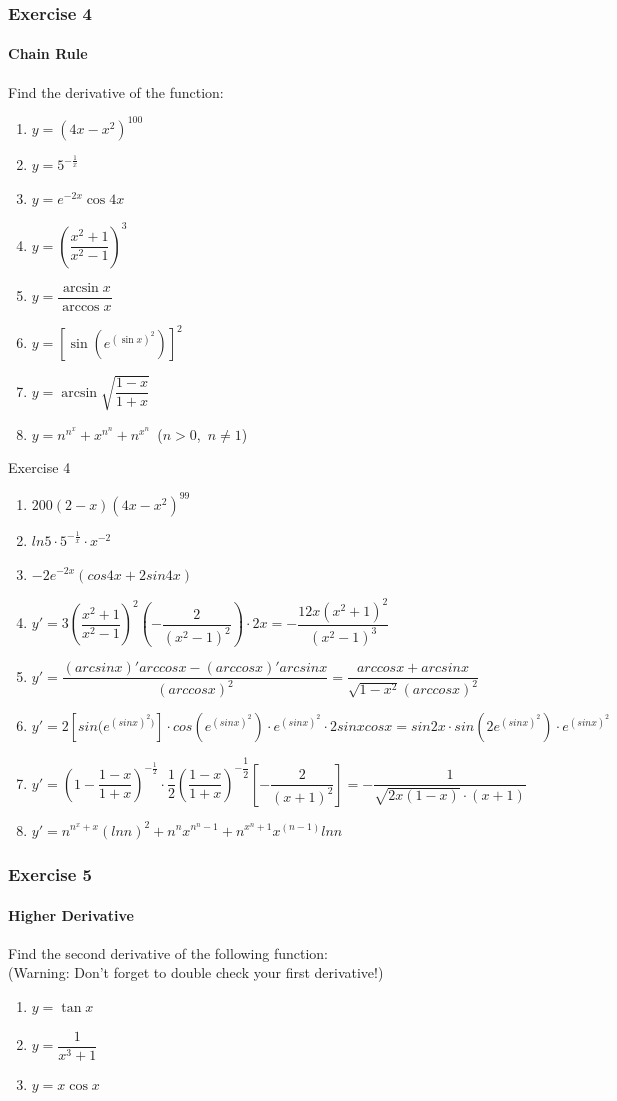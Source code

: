 \begin{frame}
    \frametitle{Exercise 4}
    \framesubtitle{Chain Rule}
    Find the derivative of the function:
    \begin{enumerate}
        \item $y = (4x - x^{2})^{100}$
        \item $y = 5^{-\frac{1}{x}}$
        \item $y = e^{-2x}\cos{4x}$
        \item $y = (\dfrac{x^{2}+1}{x^{2}-1})^{3}$
        \item $y = \dfrac{\arcsin{x}}{\arccos{x}}$
        \item $y = [\sin{(e^{(\sin{x})^{2}})}]^{2}$
        \item $y = \arcsin{\sqrt{\dfrac{1 - x}{1 + x}}}$
        \item $y = n^{n^{x}} + x^{n^{n}} + n^{x^{n}}$\ ($n > 0$,\ $n \neq 1$)
    \end{enumerate}
\end{frame}



\begin{frame}{Exercise 4}
    \begin{enumerate}
        \item $200(2-x)(4x-x^2)^{99}$
        \item $ln5\cdot5^{-\frac{1}{x}}\cdot x^{-2}$
        \item $-2e^{-2x}(cos4x + 2sin4x)$
        \item $y' = 3(\dfrac{x^2+1}{x^2-1})^2(-\dfrac{2}{(x^2 - 1)^2})\cdot 2x = -\dfrac{12x(x^2+1)^2}{(x^2-1)^3}$
        \item $y' = \dfrac{(arcsinx)'arccosx - (arccosx)'arcsinx}{(arccosx)^2} = \dfrac{arccosx + arcsinx}{\sqrt{1-x^2}(arccosx)^2}$
        \item $y' = 2[sin(e^{(sinx)^2)}]\cdot cos(e^{(sinx)^2}) \cdot e^{(sinx)^2} \cdot 2sinxcosx = sin2x \cdot sin(2e^{(sinx)^2})\cdot e^{(sinx)^2}$
        \item $y' = (1-\dfrac{1-x}{1+x})^{-\frac{1}{2}}\cdot \dfrac{1}{2}(\dfrac{1-x}{1+x})^{-\dfrac{1}{2}}[-\dfrac{2}{(x+1)^2}] = -\dfrac{1}{\sqrt{2x(1-x)}\cdot (x+1)}$
        \item $y' = n^{n^x + x}(lnn)^2 + n^nx^{n^n -1} + n^{x^n + 1}x^{(n-1)}lnn$
    \end{enumerate}
\end{frame}



\begin{frame}
    \frametitle{Exercise 5}
    \framesubtitle{Higher Derivative}
    Find the second derivative of the following function:\\
    (\alert{Warning}: Don't forget to double check your first derivative!)
    \begin{enumerate}
        \item $y = \tan{x}$
        \item $y = \dfrac{1}{x^{3} + 1}$
        \item $y = x\cos{x}$
    \end{enumerate}
\end{frame}



